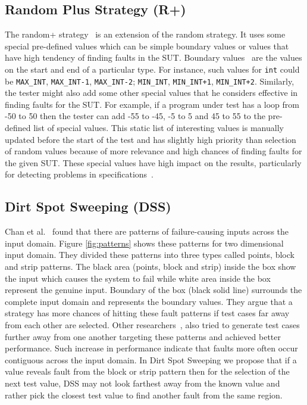 \documentclass[conference]{IEEEtran}
\begin{document}
\subsection{Random Plus Strategy (R+)}
The random+ strategy~\cite{Leitner2007} is an extension of the random strategy. It uses some special pre-defined values which can be simple boundary values or values that have high tendency of finding faults in the SUT. Boundary values~\cite{Beizer1990} are the values on the start and end of a particular type. For instance, such values for \verb+int+ could be \verb+MAX_INT+, \verb+MAX_INT-1+, \verb+MAX_INT-2+; \verb+MIN_INT+, \verb-MIN_INT+1-, \verb-MIN_INT+2-. Similarly, the tester might also add some other special values that he considers effective in finding faults for the SUT. For example, if a program under test has a loop from -50 to 50 then the tester can add -55 to -45, -5 to 5 and 45 to 55 to the pre-defined list of special values. This static list of interesting values is manually updated before the start of the test and has slightly high priority than selection of random values because of more relevance and high chances of finding faults for the given SUT. These special values have high impact on the results, particularly for detecting problems in specifications~\cite{Ciupa2008}.


\subsection{Dirt Spot Sweeping (DSS)}
Chan et al.~\cite{Chan1996} found that there are patterns of failure-causing inputs across the input domain. Figure \ref{fig:patterns} shows these patterns for two dimensional input domain. They divided these patterns into three types called points, block and strip patterns. The black area (points, block and strip) inside the box show the input which causes the system to fail while white area inside the box represent the genuine input. Boundary of the box (black solid line) surrounds the complete input domain and represents the boundary values. They argue that a strategy has more chances of hitting these fault patterns if test cases far away from each other are selected. Other researchers~\cite{Chan2002, Chen2003, Chen2005}, also tried to generate test cases further away from one another targeting these patterns and achieved better performance. Such increase in performance indicate that faults more often occur contiguous across the input domain. In Dirt Spot Sweeping we propose that if a value reveals fault from the block or strip pattern then for the selection of the next test value, DSS may not look farthest away from the known value and rather pick the closest test value to find another fault from the same region.
\end{document}
